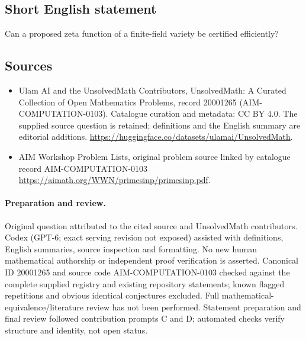 \documentclass[11pt]{article}
\begin{document}
\subsection{Short English statement}
Can a proposed zeta function of a finite-field variety be certified efficiently?
\subsection{Sources}
\begin{itemize}
\item[\hypertarget{source:20001265:1}{S1}] Ulam AI and the UnsolvedMath Contributors, UnsolvedMath: A Curated Collection of Open Mathematics Problems, record 20001265 (AIM-COMPUTATION-0103). Catalogue curation and metadata: CC BY 4.0. The supplied source question is retained; definitions and the English summary are editorial additions.
\url{https://huggingface.co/datasets/ulamai/UnsolvedMath}.
\item[\hypertarget{source:20001265:2}{S2}] AIM Workshop Problem Lists, original problem source linked by catalogue record AIM-COMPUTATION-0103
\url{https://aimath.org/WWN/primesinp/primesinp.pdf}.
\end{itemize}
\paragraph{Preparation and review.}
Original question attributed to the cited source and UnsolvedMath contributors. Codex (GPT-6; exact serving revision not exposed) assisted with definitions, English summaries, source inspection and formatting. No new human mathematical authorship or independent proof verification is asserted. Canonical ID 20001265 and source code AIM-COMPUTATION-0103 checked against the complete supplied registry and existing repository statements; known flagged repetitions and obvious identical conjectures excluded. Full mathematical-equivalence/literature review has not been performed. Statement preparation and final review followed contribution prompts C and D; automated checks verify structure and identity, not open status.
\label{end:20001265}
\end{document}
